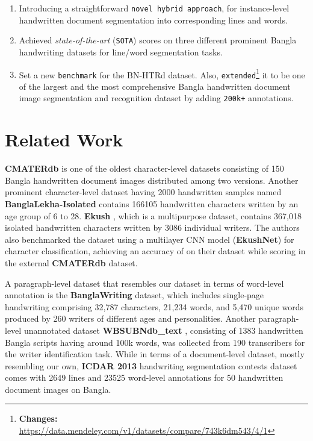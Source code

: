 \documentclass[runningheads]{llncs}
\begin{document}
\begin{enumerate}
  \item   Introducing a straightforward \texttt{novel hybrid approach}, for instance-level handwritten document segmentation into corresponding lines and words.
  
  \item	Achieved \textit{state-of-the-art} (\texttt{SOTA}) scores on three different prominent Bangla handwriting datasets for line/word segmentation tasks.
  
  \item	Set a new \texttt{benchmark} for the BN-HTRd dataset. Also, \texttt{extended}\footnote{\textbf{Changes:} \url{https://data.mendeley.com/v1/datasets/compare/743k6dm543/4/1}} it to be one of the largest and the most comprehensive Bangla handwritten document image segmentation and recognition dataset by adding \texttt{200k+} annotations.
  \vspace{-2mm}
\end{enumerate}

\section{Related Work}
\vspace{-2mm}
\textbf{CMATERdb} \cite{sarkar2012cmaterdb1} is one of the oldest character-level datasets consisting of 150 Bangla handwritten document images distributed among two versions. Another prominent character-level dataset having 2000 handwritten samples named \textbf{BanglaLekha-Isolated} \cite{biswas2017banglalekha} contains 166105 handwritten characters written by an age group of 6 to 28. \textbf{Ekush} \cite{rabby2019ekush}, which is a multipurpose dataset, contains 367,018 isolated handwritten characters written by 3086 individual writers. The authors also benchmarked the dataset using a multilayer CNN model (\textbf{EkushNet}) for character classification, achieving an accuracy of  on their dataset while scoring  in the external \textbf{CMATERdb} dataset.

A paragraph-level dataset that resembles our dataset in terms of word-level annotation is the \textbf{BanglaWriting} \cite{mridha2021banglawriting} dataset, which includes single-page handwriting comprising 32,787 characters, 21,234 words, and 5,470 unique words produced by 260 writers of different ages and personalities. Another paragraph-level unannotated dataset \textbf{WBSUBNdb\_text} \cite{halder2018content}, consisting of 1383 handwritten Bangla scripts having around 100k words, was collected from 190 transcribers for the writer identification task. While in terms of a document-level dataset, mostly resembling our own, \textbf{ICDAR 2013} \cite{stamatopoulos2013icdar} handwriting segmentation contests dataset comes with 2649 lines and  23525 word-level annotations for 50 handwritten document images on Bangla.
\end{document}
